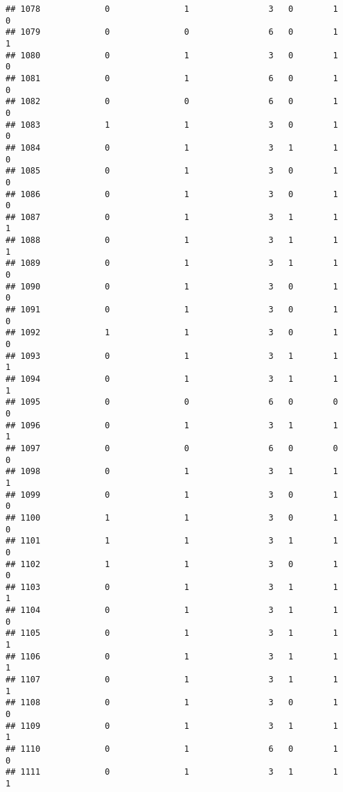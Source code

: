 \documentclass[]{article}
\begin{document}
\begin{verbatim}
## 1078             0               1                3   0        1        0
## 1079             0               0                6   0        1        1
## 1080             0               1                3   0        1        0
## 1081             0               1                6   0        1        0
## 1082             0               0                6   0        1        0
## 1083             1               1                3   0        1        0
## 1084             0               1                3   1        1        0
## 1085             0               1                3   0        1        0
## 1086             0               1                3   0        1        0
## 1087             0               1                3   1        1        1
## 1088             0               1                3   1        1        1
## 1089             0               1                3   1        1        0
## 1090             0               1                3   0        1        0
## 1091             0               1                3   0        1        0
## 1092             1               1                3   0        1        0
## 1093             0               1                3   1        1        1
## 1094             0               1                3   1        1        1
## 1095             0               0                6   0        0        0
## 1096             0               1                3   1        1        1
## 1097             0               0                6   0        0        0
## 1098             0               1                3   1        1        1
## 1099             0               1                3   0        1        0
## 1100             1               1                3   0        1        0
## 1101             1               1                3   1        1        0
## 1102             1               1                3   0        1        0
## 1103             0               1                3   1        1        1
## 1104             0               1                3   1        1        0
## 1105             0               1                3   1        1        1
## 1106             0               1                3   1        1        1
## 1107             0               1                3   1        1        1
## 1108             0               1                3   0        1        0
## 1109             0               1                3   1        1        1
## 1110             0               1                6   0        1        0
## 1111             0               1                3   1        1        1

\end{verbatim}
\end{document}
